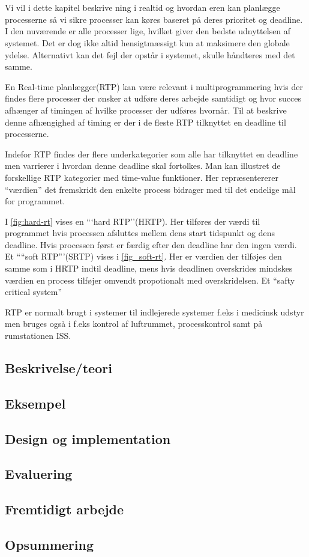 \chapter{\ds}
Vi vil i dette kapitel beskrive \sched ning i realtid og hvordan \sched eren kan planlægge processerne så vi sikre processer kan køres baseret på deres prioritet og deadline.
I den nuværende \csp er alle processer lige, hvilket giver den bedste udnyttelsen af systemet. Det er dog ikke altid hensigtmæssigt kun at maksimere den globale ydelse. Alternativt kan det fejl der opstår i systemet, skulle  håndteres med det samme. 

En Real-time planlægger(RTP) kan være relevant i multiprogrammering hvis der findes flere processer der ønsker at udføre deres arbejde samtidigt og hvor succes afhænger af timingen af hvilke processer der udføres hvornår. Til at beskrive denne afhængighed af timing er der i de fleste RTP tilknyttet en deadline til processerne.

Indefor RTP findes der flere underkategorier som alle har tilknyttet en deadline men varrierer i hvordan denne deadline skal fortolkes. Man kan illustret de forskellige RTP kategorier med time-value funktioner. Her repræsentererer ``værdien'' det fremskridt den enkelte process bidrager med til det endelige mål for programmet.

I \vref{fig:hard-rt} vises en ```hard RTP''(HRTP). Her tilføres der værdi til programmet hvis processen afsluttes mellem dens start tidspunkt og dens deadline. Hvis processen først er færdig efter den deadline har den ingen værdi. Et ````soft RTP'''(SRTP) vises i \vref{fig_soft-rt}. Her er værdien der tilføjes den samme som i HRTP indtil deadline, mens hvis deadlinen overskrides mindskes værdien en process tilføjer omvendt propotionalt med overskridelsen. Et ``safty critical system''



RTP er normalt brugt i systemer til indlejerede systemer f.eks i medicinsk udstyr men bruges også i f.eks kontrol af luftrummet,  processkontrol samt på rumstationen ISS\cite{Audsley1990}.

  \section{Beskrivelse/teori}
  
  \section{Eksempel}
  \section{Design og implementation}
  \section{Evaluering}
  \section{Fremtidigt arbejde}
  \section{Opsummering}
